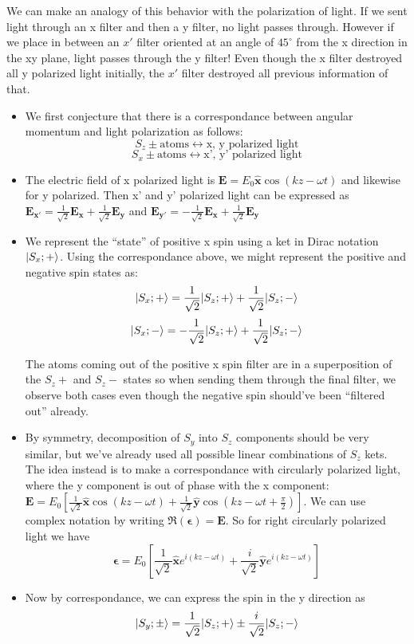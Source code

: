 \documentclass[11pt]{article}
\begin{document}
\noindent We can make an analogy of this behavior with the polarization of light. If we sent light through an x filter and then a y filter, no light passes through. However if we place in between
an \(x'\) filter oriented at an angle of \(45^{\circ}\) from the x direction in the xy plane, light passes through the y filter! Even though the x filter destroyed all y polarized light initially, 
the \(x'\) filter destroyed all previous information of that.

\begin{itemize}
    \item We first conjecture that there is a correspondance between angular momentum and light polarization as follows:
    \[
        S_z \pm \text{atoms} \leftrightarrow \text{x, y polarized light}
    \]
    \[
        S_x \pm \text{atoms} \leftrightarrow \text{x', y' polarized light}
    \]

    \item The electric field of x polarized light is \(\mathbf{E} = E_0 \mathbf{\hat{x}} \cos(kz-\omega t)\) and likewise for y polarized. Then x' and y' polarized light can be expressed as
    \(\mathbf{E_{x'}} = \frac{1}{\sqrt{2}}\mathbf{E_x} + \frac{1}{\sqrt{2}}\mathbf{E_y}\) and \(\mathbf{E_{y'}} = -\frac{1}{\sqrt{2}}\mathbf{E_x} + \frac{1}{\sqrt{2}}\mathbf{E_y}\)
    
    \item We represent the ``state'' of positive x spin using a ket in Dirac notation \(\lvert S_x; +\rangle\). Using the correspondance above, we might represent the positive and negative spin states as:
    \[
        \lvert S_x; +\rangle = \frac{1}{\sqrt{2}}\lvert S_z; +\rangle + \frac{1}{\sqrt{2}}\lvert S_z; -\rangle
    \]
    \[
        \lvert S_x; -\rangle = -\frac{1}{\sqrt{2}}\lvert S_z; +\rangle + \frac{1}{\sqrt{2}}\lvert S_z; -\rangle
    \]
    
    The atoms coming out of the positive x spin filter are in a superposition of the \(S_z +\) and \(S_z -\) states so when sending them through the final filter, we observe both cases even though the
    negative spin should've been ``filtered out'' already.
    
    \item By symmetry, decomposition of \(S_y\) into \(S_z\) components should be very similar, but we've already used all possible linear combinations of \(S_z\) kets. The idea instead is to make a correspondance
    with circularly polarized light, where the y component is out of phase with the x component: \(\mathbf{E} = E_0\left[\frac{1}{\sqrt{2}}\mathbf{\hat{x}}\cos(kz - \omega t) + \frac{1}{\sqrt{2}}\mathbf{\hat{y}}\cos(kz - \omega t + \frac{\pi}{2})\right]\).
    We can use complex notation by writing \(\Re(\mathbf{\epsilon}) = \mathbf{E}\). So for right circularly polarized light we have
    \[
        \mathbf{\epsilon} = E_0\left[\frac{1}{\sqrt{2}}\mathbf{\hat{x}}e^{i(kz -\omega t)} + \frac{i}{\sqrt{2}}\mathbf{\hat{y}}e^{i(kz - \omega t)}\right]
    \]

    \item Now by correspondance, we can express the spin in the y direction as 
    \[
        \lvert S_y; \pm\rangle = \frac{1}{\sqrt{2}}\lvert S_z; +\rangle \pm \frac{i}{\sqrt 2}\lvert S_z; -\rangle
    \]
\end{itemize}
\end{document}
